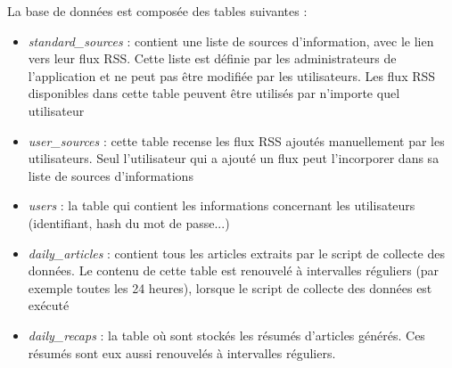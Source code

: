 \documentclass[french]{article}
\begin{document}
    La base de données est composée des tables suivantes :
    \begin{itemize}
        \item \textit{standard\_sources} : contient une liste de sources d'information, avec le lien vers leur flux RSS. Cette liste est définie par les administrateurs de l'application et ne peut pas être modifiée par les utilisateurs. Les flux RSS disponibles dans cette table peuvent être utilisés par n'importe quel utilisateur
        \item \textit{user\_sources} : cette table recense les flux RSS ajoutés manuellement par les utilisateurs. Seul l'utilisateur qui a ajouté un flux peut l'incorporer dans sa liste de sources d'informations
        \item \textit{users} : la table qui contient les informations concernant les utilisateurs (identifiant, hash du mot de passe...)
        \item \textit{daily\_articles} : contient tous les articles extraits par le script de collecte des données. Le contenu de cette table est renouvelé à intervalles réguliers (par exemple toutes les 24 heures), lorsque le script de collecte des données est exécuté
        \item \textit{daily\_recaps} : la table où sont stockés les résumés d'articles générés. Ces résumés sont eux aussi renouvelés à intervalles réguliers.
    \end{itemize}
\end{document}
